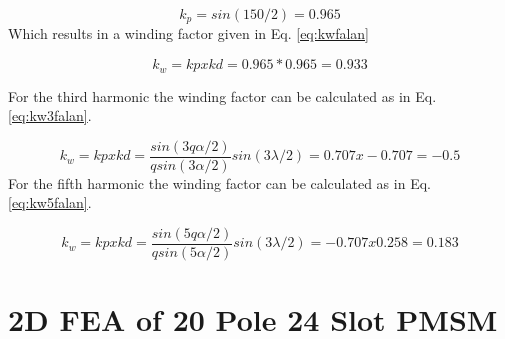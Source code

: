 \documentclass{article}
\begin{document}
 \begin{equation}
 k_p=sin(150/2)=0.965
 \label{eq:kpfalan}
 \end{equation}
  Which results in a winding factor given in Eq. \ref{eq:kwfalan}
  
   \begin{equation}
  k_w=kpxkd=0.965*0.965=0.933
  \label{eq:kwfalan}
  \end{equation}
  
 For the third harmonic the winding factor can be calculated as in Eq.\ref{eq:kw3falan}. 
 
    \begin{equation}
  k_w=kpxkd=\frac{sin(3q\alpha/2)}{qsin(3\alpha/2)}sin(3\lambda/2)=0.707x -0.707=-0.5
  \label{eq:kw3falan}
  \end{equation}
  For the fifth harmonic the winding factor can be calculated as in Eq. \ref{eq:kw5falan}.
  
  \begin{equation}
  k_w=kpxkd=\frac{sin(5q\alpha/2)}{qsin(5\alpha/2)}sin(3\lambda/2)=-0.707x 0.258=0.183 
  \label{eq:kw5falan}
  \end{equation}
  
 \section{2D FEA of 20 Pole 24 Slot PMSM}
 
 
 
\end{document}
